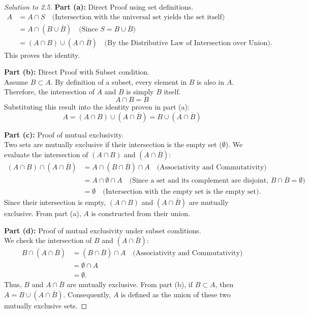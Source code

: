 \documentclass[12pt]{article}
\begin{document}
\begin{proof}[Solution to 2.5]
\textbf{Part (a):} Direct Proof using set definitions.
\begin{align*}
    A &= A \cap S \quad \text{(Intersection with the universal set yields the set itself)} \\
      &= A \cap (B \cup \overline{B}) \quad \text{(Since } S = B \cup \overline{B}\text{)} \\
      &= (A \cap B) \cup (A \cap \overline{B}) \quad \text{(By the Distributive Law of Intersection over Union)}.
\end{align*}
This proves the identity. 

\textbf{Part (b):} Direct Proof with Subset condition. \\
Assume $B \subset A$. By definition of a subset, every element in $B$ is also in $A$. Therefore, the intersection of $A$ and $B$ is simply $B$ itself. 
\[ A \cap B = B \]
Substituting this result into the identity proven in part (a):
\[ A = (A \cap B) \cup (A \cap \overline{B}) = B \cup (A \cap \overline{B}) \]

\textbf{Part (c):} Proof of mutual exclusivity. \\
Two sets are mutually exclusive if their intersection is the empty set ($\emptyset$). We evaluate the intersection of $(A \cap B)$ and $(A \cap \overline{B})$:
\begin{align*}
    (A \cap B) \cap (A \cap \overline{B}) &= A \cap (B \cap \overline{B}) \cap A \quad \text{(Associativity and Commutativity)} \\
    &= A \cap \emptyset \cap A \quad \text{(Since a set and its complement are disjoint, } B \cap \overline{B} = \emptyset\text{)} \\
    &= \emptyset \quad \text{(Intersection with the empty set is the empty set)}.
\end{align*}
Since their intersection is empty, $(A \cap B)$ and $(A \cap \overline{B})$ are mutually exclusive. From part (a), $A$ is constructed from their union.

\textbf{Part (d):} Proof of mutual exclusivity under subset conditions. \\
We check the intersection of $B$ and $(A \cap \overline{B})$:
\begin{align*}
    B \cap (A \cap \overline{B}) &= (B \cap \overline{B}) \cap A \quad \text{(Associativity and Commutativity)} \\
    &= \emptyset \cap A \\
    &= \emptyset.
\end{align*}
Thus, $B$ and $A \cap \overline{B}$ are mutually exclusive. From part (b), if $B \subset A$, then $A = B \cup (A \cap \overline{B})$. Consequently, $A$ is defined as the union of these two mutually exclusive sets. 
\end{proof}
\end{document}
